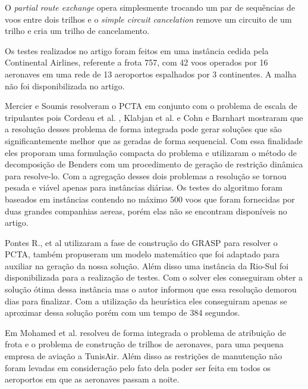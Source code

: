 O \textit{partial route exchange} opera simplesmente trocando um par de
sequências de voos entre dois trilhos e o \textit{simple circuit cancelation}
remove um circuito de um trilho e cria um trilho de cancelamento. 

Os testes realizados no artigo foram feitos em uma instância cedida pela
Continental Airlines, referente a frota 757, com 42 voos operados por 16
aeronaves em uma rede de 13 aeroportos espalhados por 3 continentes. A malha
não foi disponibilizada no artigo.

		
Mercier e Soumis \cite{mercier2007} resolveram o PCTA em conjunto com
o problema de escala de tripulantes pois Cordeau et al. \cite{cordeau2001},
Klabjan et al. \cite{klabjan2002} e Cohn e Barnhart \cite{mainville2003}
mostraram que a resolução desses problema de forma integrada pode gerar
soluções que são significantemente melhor que as geradas de forma sequencial.
Com essa finalidade eles proporam uma formulação compacta do problema e
utilizaram o método de decomposição de Benders com um procedimento de geração
de restrição dinâmica para resolve-lo. Com a agregação desses dois problemas a
resolução se tornou pesada e viável apenas para instâncias diárias. Os testes
do algoritmo foram baseados em instâncias contendo no máximo 500 voos que 
foram fornecidas por duas grandes companhias aereas, porém elas não se
encontram disponíveis no artigo. 
		
Pontes R., et al \cite{pontes2002} utilizaram a fase de construção do GRASP
para resolver o PCTA, também propuseram um modelo matemático que foi
adaptado para auxiliar na geração da nossa solução. Além disso uma instância
da Rio-Sul foi disponibilizada para a realização de testes. Com o solver eles
conseguiram obter a solução ótima dessa instância mas o autor informou que
essa resolução demorou dias para finalizar. Com a utilização da heurística
eles conseguiram apenas se aproximar dessa solução porém com um tempo de 384
segundos.
		
Em \cite{mohamed2011} Mohamed et al. resolveu de forma integrada o problema
de atribuição de frota e o problema de construção de trilhos de aeronaves,
para uma pequena empresa de aviação a TunisAir. Além disso as restrições de
manutenção não foram levadas em consideração pelo fato dela poder ser feita
em todos os aeroportos em que as aeronaves passam a noite.
		
 